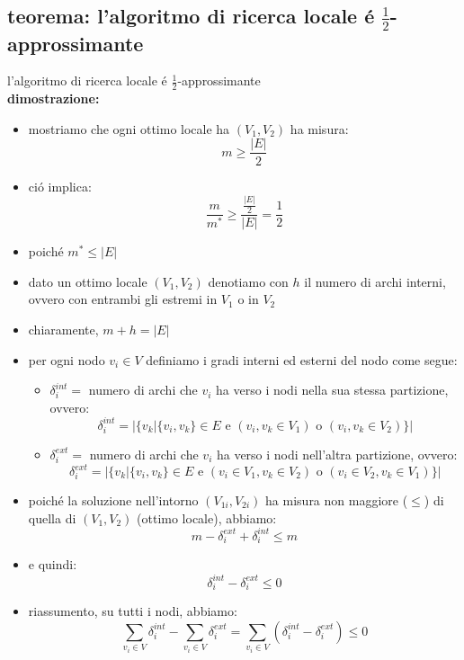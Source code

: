 \subsection*{teorema: l'algoritmo di ricerca locale \'e $\frac{1}{2}$-approssimante}
\begin{flushleft}
	l'algoritmo di ricerca locale \'e $\frac{1}{2}$-approssimante \newline \\
	\vspace{0.5cm}
	\textbf{dimostrazione:}
	\begin{itemize}
		\item mostriamo che ogni ottimo locale ha $(V_1,V_2)$ ha misura:
			$$m\geq\frac{\vert E\vert}{2}$$
		\item ci\'o implica:
			$$\frac{m}{m^*}\geq\frac{\frac{\vert E\vert}{2}}{\vert E\vert}=\frac{1}{2}$$
		\vspace{0.5cm}
		\item poich\'e $m^*\leq\vert E\vert$
		\item dato un ottimo locale $(V_1,V_2)$ denotiamo con $h$ il numero di archi interni, ovvero con entrambi gli estremi in $V_1$ o in $V_2$
		\item chiaramente, $m+h=\vert E\vert$
		\item per ogni nodo $v_i\in V$ definiamo i gradi interni ed esterni del nodo come segue:
		\begin{itemize}
			\item $\delta_i^{int}=$ numero di archi che $v_i$ ha verso i nodi nella sua stessa partizione, ovvero:
				$$\delta_i^{int}=\vert\{v_k\vert\{v_i,v_k\}\in E\text{ e }(v_i,v_k\in V_1)\text{ o }(v_i,v_k\in V_2)\}\vert$$
			\item $\delta_i^{ext}=$ numero di archi che $v_i$ ha verso i nodi nell'altra partizione, ovvero:
				$$\delta_i^{ext}=\vert\{v_k\vert\{v_i,v_k\}\in E\text{ e }(v_i\in V_1,v_k\in V_2)\text{ o }(v_i\in V_2,v_k\in V_1)\}\vert$$
		\end{itemize}
		\item poich\'e la soluzione nell'intorno $(V_{1i},V_{2i})$ ha misura non maggiore ($\leq$) di quella di $(V_1,V_2)$ (ottimo locale), abbiamo:
			$$m-\delta_i^{ext}+\delta_i^{int}\leq m$$
		\item e quindi:
			$$\delta_i^{int}-\delta_i^{ext}\leq 0$$
		\item riassumento, su tutti i nodi, abbiamo:
			$$\sum_{v_i\in V}\delta_i^{int}-\sum_{v_i\in V}\delta_i^{ext}=\sum_{v_i\in V}(\delta_i^{int}-\delta_i^{ext})\leq 0$$

\end{itemize}
\end{flushleft}
